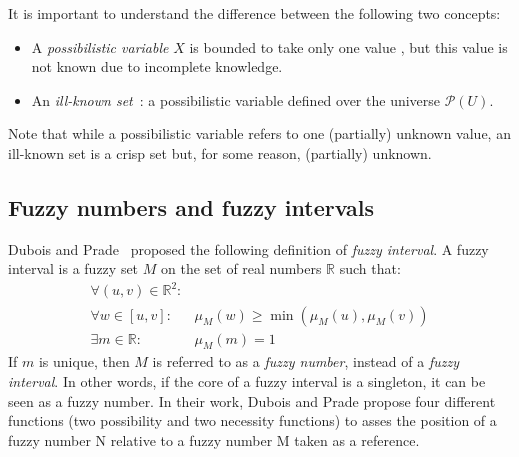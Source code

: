 \documentclass[twoside,twocolumn,a4paper]{article}
\newcommand{\Pow}{\mathcal{P}}
\begin{document}
It is important to understand the difference between the following two concepts:
\begin{itemize}
\item
A \emph{possibilistic variable} $X$ is bounded to take only one value , but this value is not known due to incomplete knowledge. 
\item
An \emph{ill-known set}~\cite{Dubois88b}: a possibilistic variable defined over the universe $\Pow(U)$.
\end{itemize}

Note that while a possibilistic variable refers to one (partially) unknown value, an ill-known set is a crisp set but, for some reason, (partially) unknown.


\subsection{\label{subsec:fuzzy-numbers}Fuzzy numbers and fuzzy intervals}
Dubois and Prade~\cite{Dubois1983} proposed the following definition of \emph{fuzzy interval}.
A fuzzy interval is a fuzzy set $M$ on the set of real numbers $\mathbb{R}$ such that:
\begin{eqnarray}
\forall (u,v)\in\mathbb{R}^2:&\\
\nonumber
\forall w \in [u,v]:&\mu_M(w) \geq\min(\mu_M(u),\mu_M(v))  \\
\exists m \in \mathbb{R}:& \mu_M(m)=1 
\end{eqnarray}
If $m$ is unique, then $M$ is referred to as a \emph{fuzzy number}, instead of a \emph{fuzzy interval}. In other words, if the core of a fuzzy interval is a singleton, it can be seen as a fuzzy number. In their work, Dubois and Prade propose four different functions (two possibility and two necessity functions) to asses the position of a fuzzy number N relative to  a fuzzy number M taken as a reference.
\end{document}
